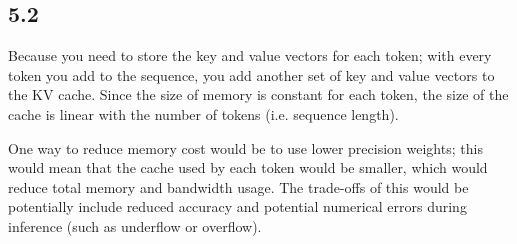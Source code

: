 \documentclass{article}
\begin{document}
\subsection*{5.2}

Because you need to store the key and value vectors for each token; with every token you add to the sequence, you add another set of key and value vectors to the KV cache. Since the size of memory is constant for each token, the size of the cache is linear with the number of tokens (i.e. sequence length).

One way to reduce memory cost would be to use lower precision weights; this would mean that the cache used by each token would be smaller, which would reduce total memory and bandwidth usage. The trade-offs of this would be potentially include reduced accuracy and potential numerical errors during inference (such as underflow or overflow).
\end{document}

